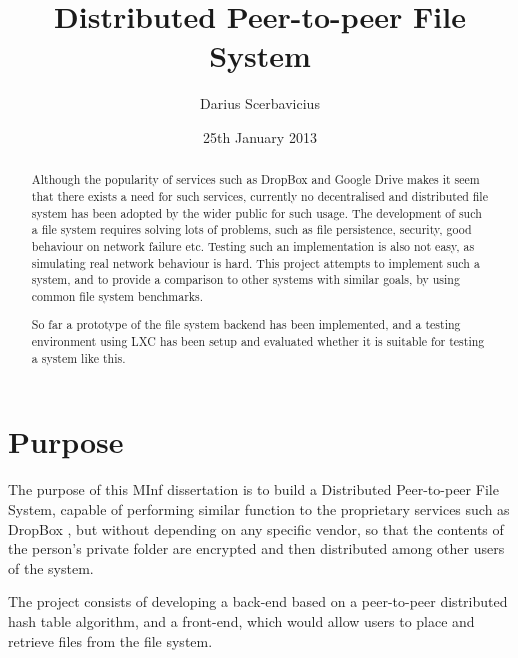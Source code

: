 \documentclass[8pt,a4paper]{article}
\title{Distributed Peer-to-peer File System}
\author{Darius Scerbavicius}
\date{25th January 2013}
\begin{document}
\maketitle

\begin{abstract}
Although the popularity of services such as DropBox and Google Drive makes it seem
that there exists a need for such services, currently no decentralised and distributed
file system has been adopted by the wider public for such usage. The development of such
a file system requires solving lots of problems, such as file persistence, security, 
good behaviour on network failure etc. Testing such an implementation is also not easy,
as simulating real network behaviour is hard. This project attempts to implement such a system,
and to provide a comparison to other systems with similar goals, by using common
file system benchmarks. 

So far a prototype of the file system backend has been implemented, and a testing environment
using LXC has been setup and evaluated whether it is suitable for testing a system like this.

\end{abstract}

%
%
%
%

\section{Purpose}
The purpose of this MInf dissertation is to build a Distributed Peer-to-peer File System, capable of performing similar function to the proprietary services such as DropBox \cite{dropbox}, but without depending on any specific vendor, so that the contents of the person's private folder are encrypted and then distributed among other users of the system. 

The project consists of developing a back-end based on a peer-to-peer distributed hash table algorithm, and a front-end, which would allow users to place and retrieve files from the file system.
\end{document}
